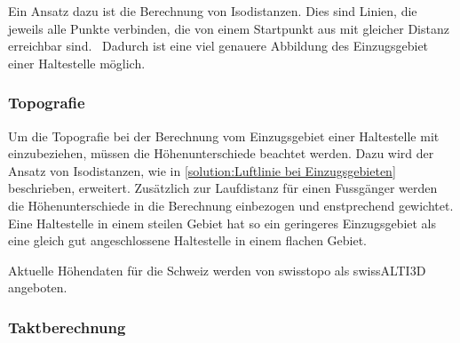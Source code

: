 Ein Ansatz dazu ist die Berechnung von Isodistanzen.
Dies sind Linien, die jeweils alle Punkte verbinden, die von einem Startpunkt aus mit gleicher Distanz erreichbar sind.~\cite{isodistance_gislounge}
Dadurch ist eine viel genauere Abbildung des Einzugsgebiet einer Haltestelle möglich.


\subsubsection{Topografie}
\label{solution:Topografie}

Um die Topografie bei der Berechnung vom Einzugsgebiet einer Haltestelle mit einzubeziehen, müssen die Höhenunterschiede beachtet werden.
Dazu wird der Ansatz von Isodistanzen, wie in \ref{solution:Luftlinie bei Einzugsgebieten} beschrieben, erweitert. Zusätzlich zur Laufdistanz für einen Fussgänger werden die Höhenunterschiede in die Berechnung einbezogen und enstprechend gewichtet.
Eine Haltestelle in einem steilen Gebiet hat so ein geringeres Einzugsgebiet als eine gleich gut angeschlossene Haltestelle in einem flachen Gebiet.

Aktuelle Höhendaten für die Schweiz werden von swisstopo als swissALTI3D angeboten.~\cite{swissalti3d_swisstopo}

\subsubsection{Taktberechnung}
\label{solution:Taktberechnung}




